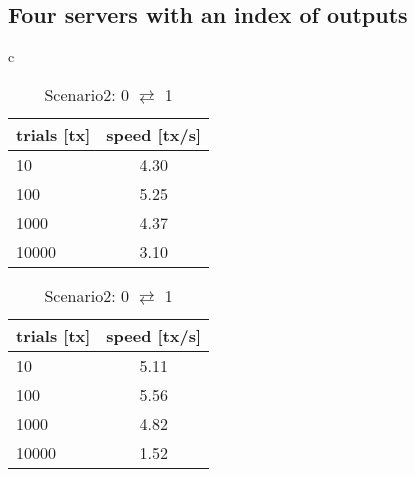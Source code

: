 \documentclass[a4j,11pt,uplatex,onecolumn]{article}
\begin{document}
\subsection{Four servers with an index of outputs}
\begin{table}[htb]
    \begin{center}
        \begin{tabular}{c}

            \begin{minipage}{0.5\hsize}
                \begin{center}
                    \caption{Scenario1: 0 $\rightarrow$ 1}
                    \begin{tabular}{|l|c|} \hline
                        trials [tx] & speed [tx/s]\\ \hline \hline
                        10 & 4.30 \\
                        100 & 5.25 \\
                        1000 & 4.37 \\ 
                        10000 & 3.10 \\ \hline
                    \end{tabular}
                \end{center}
            \end{minipage}

            \begin{minipage}{0.5\hsize}
                \begin{center}
                    \caption{Scenario2: 0 $\rightleftarrows$ 1}
                    \begin{tabular}{|l|c|} \hline
                        trials [tx] & speed [tx/s]\\ \hline \hline
                        10 & 5.11 \\
                        100 & 5.56 \\
                        1000 & 4.82 \\
                        10000 & 1.52 \\ \hline
                    \end{tabular}
                \end{center}
            \end{minipage}

        \end{tabular}
    \end{center}
\end{table}
\end{document}
